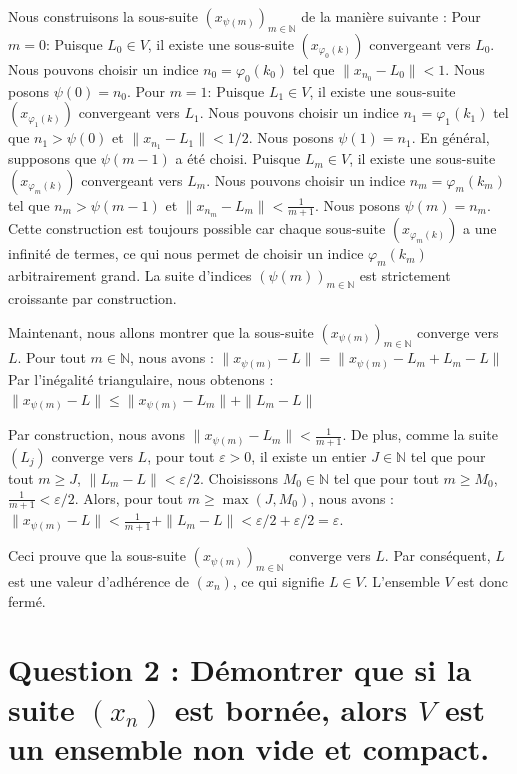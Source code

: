 \documentclass{report}
\begin{document}
Nous construisons la sous-suite $(x_{\psi(m)})_{m \in \mathbb{N}}$ de la manière suivante :
Pour $m=0$: Puisque $L_0 \in V$, il existe une sous-suite $(x_{\varphi_0(k)})$ convergeant vers $L_0$. Nous pouvons choisir un indice $n_0 = \varphi_0(k_0)$ tel que $\|x_{n_0} - L_0\| < 1$. Nous posons $\psi(0) = n_0$.
Pour $m=1$: Puisque $L_1 \in V$, il existe une sous-suite $(x_{\varphi_1(k)})$ convergeant vers $L_1$. Nous pouvons choisir un indice $n_1 = \varphi_1(k_1)$ tel que $n_1 > \psi(0)$ et $\|x_{n_1} - L_1\| < 1/2$. Nous posons $\psi(1) = n_1$.
En général, supposons que $\psi(m-1)$ a été choisi. Puisque $L_m \in V$, il existe une sous-suite $(x_{\varphi_m(k)})$ convergeant vers $L_m$. Nous pouvons choisir un indice $n_m = \varphi_m(k_m)$ tel que $n_m > \psi(m-1)$ et $\|x_{n_m} - L_m\| < \frac{1}{m+1}$. Nous posons $\psi(m) = n_m$.
Cette construction est toujours possible car chaque sous-suite $(x_{\varphi_m(k)})$ a une infinité de termes, ce qui nous permet de choisir un indice $\varphi_m(k_m)$ arbitrairement grand. La suite d'indices $(\psi(m))_{m \in \mathbb{N}}$ est strictement croissante par construction.

Maintenant, nous allons montrer que la sous-suite $(x_{\psi(m)})_{m \in \mathbb{N}}$ converge vers $L$.
Pour tout $m \in \mathbb{N}$, nous avons :
$\|x_{\psi(m)} - L\| = \|x_{\psi(m)} - L_m + L_m - L\|$
Par l'inégalité triangulaire, nous obtenons :
$\|x_{\psi(m)} - L\| \le \|x_{\psi(m)} - L_m\| + \|L_m - L\|$

Par construction, nous avons $\|x_{\psi(m)} - L_m\| < \frac{1}{m+1}$.
De plus, comme la suite $(L_j)$ converge vers $L$, pour tout $\varepsilon > 0$, il existe un entier $J \in \mathbb{N}$ tel que pour tout $m \ge J$, $\|L_m - L\| < \varepsilon/2$.
Choisissons $M_0 \in \mathbb{N}$ tel que pour tout $m \ge M_0$, $\frac{1}{m+1} < \varepsilon/2$.
Alors, pour tout $m \ge \max(J, M_0)$, nous avons :
$\|x_{\psi(m)} - L\| < \frac{1}{m+1} + \|L_m - L\| < \varepsilon/2 + \varepsilon/2 = \varepsilon$.

Ceci prouve que la sous-suite $(x_{\psi(m)})_{m \in \mathbb{N}}$ converge vers $L$.
Par conséquent, $L$ est une valeur d'adhérence de $(x_n)$, ce qui signifie $L \in V$.
L'ensemble $V$ est donc fermé.

\section*{Question 2 : Démontrer que si la suite $(x_n)$ est bornée, alors $V$ est un ensemble non vide et compact.}
\end{document}
